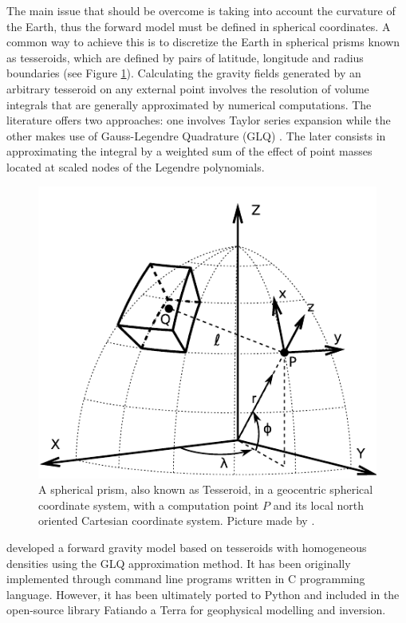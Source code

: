 \documentclass[extra]{gji}
\begin{document}
The main issue that should be overcome is taking into account the curvature of the Earth, thus the forward model must be defined in spherical coordinates.
A common way to achieve this is to discretize the Earth in spherical prisms known as tesseroids, which are defined by pairs of latitude, longitude and radius boundaries (see Figure \ref{fig:tesseroid-uieda}).
Calculating the gravity fields generated by an arbitrary tesseroid on any external point involves the resolution of volume integrals that are generally approximated by numerical computations.
The literature offers two approaches: one involves Taylor series expansion \citep{Heck2007, Grombein2013} while the other makes use of Gauss-Legendre Quadrature (GLQ) \citep{Asgharzadeh2007, Uieda2016, Uieda2017}.
The later consists in approximating the integral by a weighted sum of the effect of point masses located at scaled nodes of the Legendre polynomials.

\begin{figure}
\centering
\includegraphics[width=0.9\linewidth]{figures/tesseroid-uieda.pdf}
\caption{
A spherical prism, also known as  Tesseroid, in a geocentric spherical coordinate system, with a computation point $P$ and its local north oriented Cartesian coordinate system. Picture made by \citet{Uieda2015}.
}
\label{fig:tesseroid-uieda}
\end{figure}

\citet{Uieda2016} developed a forward gravity model based on tesseroids with homogeneous densities using the GLQ approximation method.
It has been originally implemented through command line programs written in C programming language.
However, it has been ultimately ported to Python and included in the open-source library Fatiando a Terra \citep{Uieda2013} for geophysical modelling and inversion.
\end{document}
